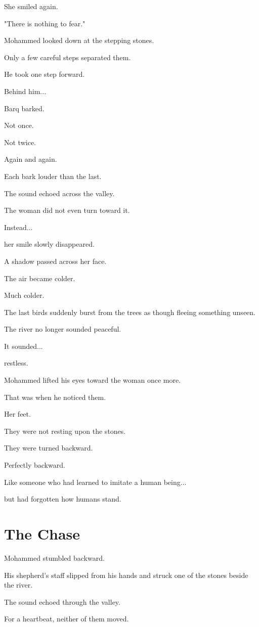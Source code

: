 \documentclass[12pt,openany]{book}
\begin{document}
She smiled again.

"There is nothing to fear."

Mohammed looked down at the stepping stones.

Only a few careful steps separated them.

He took one step forward.

Behind him...

Barq barked.

Not once.

Not twice.

Again and again.

Each bark louder than the last.

The sound echoed across the valley.

The woman did not even turn toward it.

Instead...

her smile slowly disappeared.

A shadow passed across her face.

The air became colder.

Much colder.

The last birds suddenly burst from the trees as though fleeing something unseen.

The river no longer sounded peaceful.

It sounded...

restless.

Mohammed lifted his eyes toward the woman once more.

That was when he noticed them.

Her feet.

They were not resting upon the stones.

They were turned backward.

Perfectly backward.

Like someone who had learned to imitate a human being...

but had forgotten how humans stand.
\section*{The Chase}

Mohammed stumbled backward.

His shepherd's staff slipped from his hands and struck one of the stones beside the river.

The sound echoed through the valley.

For a heartbeat, neither of them moved.
\end{document}
